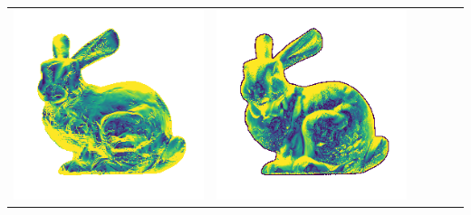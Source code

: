 \begin{center}
\begin{tabularx}{\linewidth}{@{}Y@{}Y@{}Y@{}Y@{}Y@{}Y@{}}
\includegraphics[width=\linewidth]{semisynthetic/20160617_14_yu_err.png} &
\includegraphics[width=\linewidth]{semisynthetic/20160617_14_dpsn_err.png} &

\end{tabularx}
\end{center}
